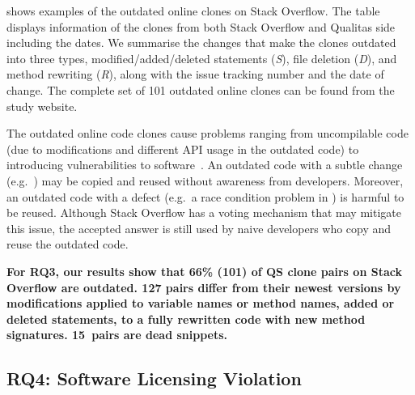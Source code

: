 \documentclass[10pt,journal,compsoc]{IEEEtran}
\begin{document}
 shows examples of the outdated online clones on
Stack Overflow. The table displays information of the clones from both Stack
Overflow and Qualitas side including the dates. We summarise the changes that
make the clones outdated into three types, modified/added/deleted statements
(\textit{S}), file deletion (\textit{D}), and method rewriting (\textit{R}),
along with the issue tracking number and the date of change. The complete set of
101 outdated online clones can be found from the study website.

The outdated online code clones cause problems ranging from uncompilable code
(due to modifications and different API usage in the outdated code) to
introducing vulnerabilities to software~\cite{Xia2014}. An outdated code with a
subtle change (e.g.~) may be copied and reused without
awareness from developers. Moreover, an outdated code with a defect
(e.g.~a race condition problem in ) is harmful to be reused. Although Stack
Overflow has a voting mechanism that may mitigate this issue, the accepted
answer is still used by naive developers who copy and reuse the outdated code.

\textbf{For RQ3, our results show that 66\% (101) of QS clone pairs on Stack
	Overflow are outdated. 127 pairs differ from their newest versions by
	modifications applied to variable names or method names, added or deleted
	statements, to a fully rewritten code with new method signatures. 15~pairs are
	dead snippets.}

\subsection{RQ4: Software Licensing Violation}

\begin{table}[]
	\centering
	\caption{License mapping of  online clones (file-level)}
	\label{tab:license_abc}
\end{table}
\end{document}
